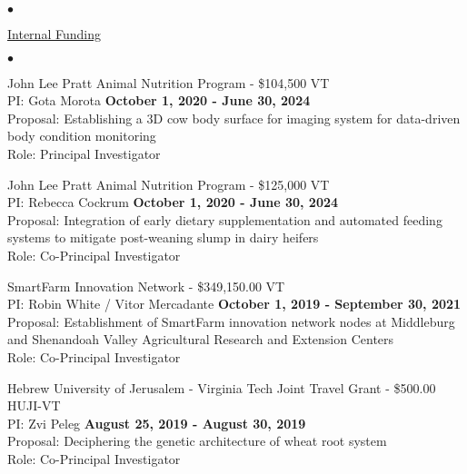 \documentclass[margin,line,10pt]{res}
\newenvironment{list2}{
  \begin{list}{$\bullet$}{%
      \setlength{\itemsep}{0in}
      \setlength{\parsep}{0in} \setlength{\parskip}{0in}
      \setlength{\topsep}{0in} \setlength{\partopsep}{0in} 
      \setlength{\leftmargin}{0.2in}}}{\end{list}}
\begin{document}
\begin{resume}
\begin{list2}
\end{list2}




\begin{flushleft}
\hspace{0.2cm} \underline{Internal Funding}
\end{flushleft}
\begin{list2}

\item John Lee Pratt Animal Nutrition Program - \$104,500  \hfill VT\\
PI: Gota Morota \hfill \textbf{October 1, 2020 - June 30, 2024}\\
Proposal: Establishing a 3D cow body surface for imaging system for data-driven body condition monitoring\\
Role: Principal Investigator \\


\vspace{0.5cm}


\item John Lee Pratt Animal Nutrition Program - \$125,000  \hfill VT\\
PI: Rebecca Cockrum \hfill \textbf{October 1, 2020 - June 30, 2024}\\
Proposal: Integration of early dietary supplementation and automated feeding systems to mitigate post-weaning slump in dairy heifers\\
Role: Co-Principal Investigator \\

\vspace{0.5cm}

\item SmartFarm Innovation Network - \$349,150.00  \hfill VT\\
PI: Robin White / Vitor Mercadante  \hfill \textbf{October 1, 2019 - September 30, 2021}\\
Proposal: Establishment of SmartFarm innovation network nodes at Middleburg and Shenandoah Valley Agricultural Research and Extension Centers \\
Role: Co-Principal Investigator \\

\vspace{0.5cm}


\item  Hebrew University of Jerusalem - Virginia Tech Joint Travel Grant - \$500.00  \hfill HUJI-VT\\
PI: Zvi Peleg  \hfill \textbf{August 25, 2019 - August 30, 2019}\\
Proposal: Deciphering the genetic architecture of wheat root system \\
Role: Co-Principal Investigator \\



\end{list2}
\end{resume}
\end{document}
